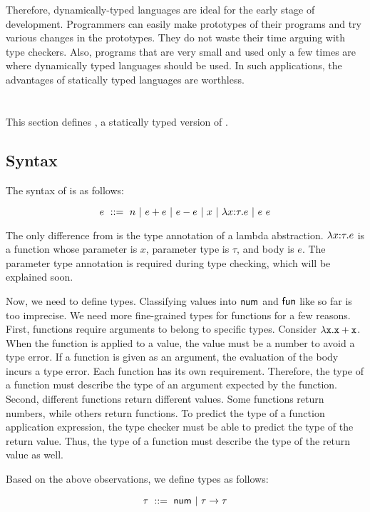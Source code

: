 Therefore, dynamically-typed languages are ideal for the early stage of
development. Programmers can easily make prototypes of their programs and try
various changes in the prototypes. They do not waste their time arguing with type
checkers. Also, programs that are very small and used only a few times are where
dynamically typed languages should be used. In such applications, the advantages
of statically typed languages are worthless.

\section{\Lang}

This section defines \Lang, a statically typed version of \plang.

\subsection{Syntax}

The syntax of \Lang is as follows:

\[
e\ ::=\ n
\ |\ e + e
\ |\ e - e
\ |\ x
\ |\ \lambda x{:}\tau.e
\ |\ e\ e
\]

The only difference from \plang is the type annotation of a lambda abstraction.
$\lambda x{:}\tau.e$ is a function whose parameter is $x$, parameter type is
$\tau$, and body is $e$. The parameter type annotation is required during
type checking, which will be explained soon.

Now, we need to define types. Classifying values into $\textsf{num}$ and $\textsf{fun}$ like so
far is too imprecise. We need more fine-grained types for functions for a few
reasons. First, functions require arguments to belong to specific types.
Consider $\lambda\texttt{x}.\texttt{x}+\texttt{x}$. When the function is applied to a value, the
value must be a number to avoid a type error. If a function is given as an
argument, the evaluation of the body incurs a type error. Each function has its
own requirement. Therefore, the type of a function must describe the type of an
argument expected by the function. Second, different functions return different
values. Some functions return numbers, while others return functions. To
predict the type of a function application expression, the type checker must be
able to predict the type of the return value. Thus, the type of a function must
describe the type of the return value as well.

Based on the above observations, we define types as follows:

\[
\tau\ ::=\ \tnum\ |\ \tarrow{\tau}{\tau}
\]

